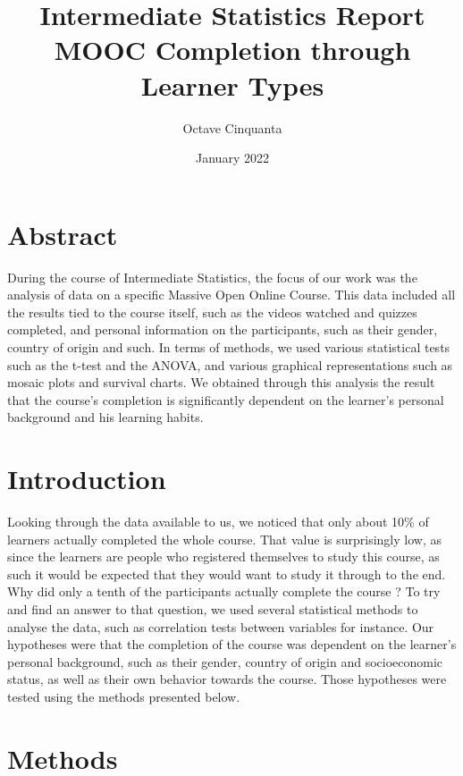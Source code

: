 \documentclass[12pt]{article}
\title{\textbf{Intermediate Statistics Report} \\ MOOC Completion through Learner Types}
\author{Octave Cinquanta}
\date{January 2022}
\begin{document}
\maketitle

\section{Abstract}

During the course of Intermediate Statistics, the focus of our work was the analysis of data on a specific Massive Open Online Course. This data included all the results tied to the course itself, such as the videos watched and quizzes completed, and personal information on the participants, such as their gender, country of origin and such. In terms of methods, we used various statistical tests such as the t-test and the ANOVA, and various graphical representations such as mosaic plots and survival charts. We obtained through this analysis the result that the course's completion is significantly dependent on the learner's personal background and his learning habits.

\tableofcontents
\listoffigures
\listoftables

\section{Introduction}

Looking through the data available to us, we noticed that only about 10\% of learners actually completed the whole course. That value is surprisingly low, as since the learners are people who registered themselves to study this course, as such it would be expected that they would want to study it through to the end. Why did only a tenth of the participants actually complete the course ? To try and find an answer to that question, we used several statistical methods to analyse the data, such as correlation tests between variables for instance. Our hypotheses were that the completion of the course was dependent on the learner's personal background, such as their gender, country of origin and socioeconomic status, as well as their own behavior towards the course. Those hypotheses were tested using the methods presented below.

\section{Methods}
\end{document}
